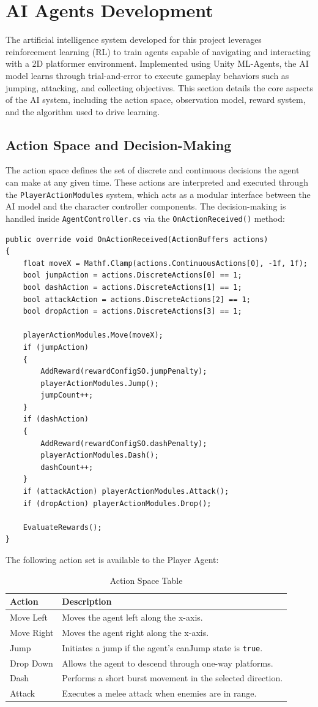 \documentclass[12pt,oneside,openright,a4paper]{cpe-english-project}
\begin{document}
\section{AI Agents Development}
The artificial intelligence system developed for this project leverages reinforcement learning (RL) to train agents capable of navigating and interacting with a 2D platformer environment. Implemented using Unity ML-Agents, the AI model learns through trial-and-error to execute gameplay behaviors such as jumping, attacking, and collecting objectives. This section details the core aspects of the AI system, including the action space, observation model, reward system, and the algorithm used to drive learning.
\subsection{Action Space and Decision-Making}
The action space defines the set of discrete and continuous decisions the agent can make at any given time. These actions are interpreted and executed through the \texttt{PlayerActionModules} system, which acts as a modular interface between the AI model and the character controller components.
The decision-making is handled inside \texttt{AgentController.cs} via the \texttt{OnActionReceived()} method:
\begin{lstlisting}[language={[Sharp]C}]
public override void OnActionReceived(ActionBuffers actions)
{
	float moveX = Mathf.Clamp(actions.ContinuousActions[0], -1f, 1f);
	bool jumpAction = actions.DiscreteActions[0] == 1;
	bool dashAction = actions.DiscreteActions[1] == 1;
	bool attackAction = actions.DiscreteActions[2] == 1;
	bool dropAction = actions.DiscreteActions[3] == 1;

	playerActionModules.Move(moveX);
	if (jumpAction)
	{
		AddReward(rewardConfigSO.jumpPenalty);
		playerActionModules.Jump();
		jumpCount++;
	}
	if (dashAction)
	{
		AddReward(rewardConfigSO.dashPenalty);
		playerActionModules.Dash();
		dashCount++;
	}
	if (attackAction) playerActionModules.Attack();
	if (dropAction) playerActionModules.Drop();

	EvaluateRewards();
}
\end{lstlisting}
The following action set is available to the Player Agent:
\begin{table}[!h]
\caption{Action Space Table}\label{tbl:Action Space Table}
\begin{tabular}{|l|l|} \hline
\textbf{Action} & \textbf{Description} \\ \hline
Move Left & Moves the agent left along the x-axis. \\ 
Move Right & Moves the agent right along the x-axis. \\ 
Jump & Initiates a jump if the agent's canJump state is \texttt{true}. \\ 
Drop Down & Allows the agent to descend through one-way platforms. \\ 
Dash & Performs a short burst movement in the selected direction. \\ 
Attack & Executes a melee attack when enemies are in range. \\ \hline
\end{tabular}
\end{table}
\end{document}
